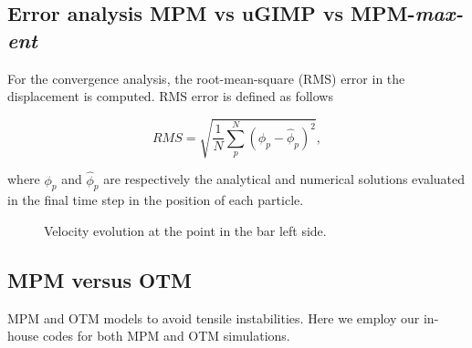 \subsection{Error analysis MPM vs uGIMP vs MPM-\textit{max-ent}}
\label{sec:study-error}

For the convergence analysis, the root-mean-square (RMS) error in the
displacement is computed. RMS error is defined as follows

\begin{equation}
  \label{eq:RMS}
  RMS = \sqrt{\frac{1}{N} \sum^{N}_p \left( \phi_p - \hat{\phi}_p \right)^2},
\end{equation}

where $\phi_p$ and $\hat{\phi}_p$ are respectively the analytical and
numerical solutions evaluated in the final time step in the position
of each particle.


\begin{figure}\sidecaption
  \centering
  \caption{Velocity evolution at the point in the bar left side.}
  \label{fig:Dyka-MPM-uGIMP-LME}
\end{figure}

\subsection{MPM versus OTM}
\label{sec:mpm-versus-otm}

MPM \cite{Sulsky1994} and OTM
models to avoid tensile instabilities. Here we employ our in-house
codes for both MPM and OTM simulations.

